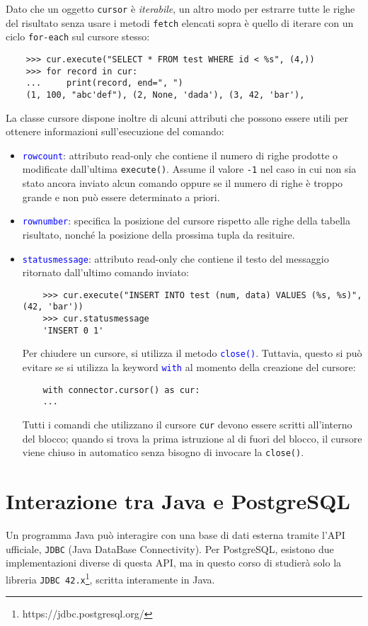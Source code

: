 \documentclass[12pt,a4paper]{book}
\begin{document}
	Dato che un oggetto \texttt{cursor} è \textit{iterabile}, un altro modo per estrarre tutte le righe del risultato senza usare i metodi \texttt{fetch} elencati sopra è quello di iterare con un ciclo \texttt{for-each} sul cursore stesso:
	\begin{lstlisting}
	>>> cur.execute("SELECT * FROM test WHERE id < %s", (4,)) 
	>>> for record in cur:
	...     print(record, end=", ")
	(1, 100, "abc'def"), (2, None, 'dada'), (3, 42, 'bar'),
	\end{lstlisting}
	La classe cursore dispone inoltre di alcuni attributi che possono essere utili per ottenere informazioni sull'esecuzione del comando:
	\begin{itemize}
		\item \textcolor{blue}{\texttt{rowcount}}: attributo read-only che contiene il numero di righe prodotte o modificate dall'ultima \texttt{execute()}. Assume il valore \texttt{-1} nel caso in cui non sia stato ancora inviato alcun comando oppure se il numero di righe è troppo grande e non può essere determinato a priori.
		\item \textcolor{blue}{\texttt{rownumber}}: specifica la posizione del cursore rispetto alle righe della tabella risultato, nonché la posizione della prossima tupla da resituire.
		\item \textcolor{blue}{\texttt{statusmessage}}: attributo read-only che contiene il testo del messaggio ritornato dall'ultimo comando inviato:
		\begin{lstlisting}
	>>> cur.execute("INSERT INTO test (num, data) VALUES (%s, %s)", (42, 'bar'))
	>>> cur.statusmessage
	'INSERT 0 1'
		\end{lstlisting}
		Per chiudere un cursore, si utilizza il metodo \textcolor{blue}{\texttt{close()}}. Tuttavia, questo si può evitare se si utilizza la keyword \textcolor{blue}{\texttt{with}} al momento della creazione del cursore:
		\begin{lstlisting}
	with connector.cursor() as cur:
	...
		\end{lstlisting}
		Tutti i comandi che utilizzano il cursore \texttt{cur} devono essere scritti all'interno del blocco; quando si trova la prima istruzione al di fuori del blocco, il cursore viene chiuso in automatico senza bisogno di invocare la \texttt{close()}.
	\end{itemize}
	\chapter{Interazione tra Java e PostgreSQL}
	Un programma Java può interagire con una base di dati esterna tramite l'API ufficiale, \texttt{JDBC} (Java DataBase Connectivity). Per PostgreSQL, esistono due implementazioni diverse di questa API, ma in questo corso di studierà solo la libreria \texttt{JDBC 42.x}\footnote{https://jdbc.postgresql.org/}, scritta interamente in Java.
\end{document}
